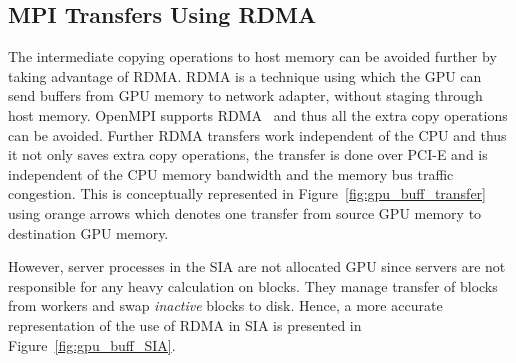 \subsection{MPI Transfers Using RDMA}
The intermediate copying operations to host memory can be avoided further by
taking advantage of RDMA. RDMA is a technique using
which the GPU can send buffers from GPU memory to network adapter, without staging
through host memory. OpenMPI supports RDMA~\cite{openmpi-cudaaware} and thus all
the extra copy operations can be avoided.
Further RDMA transfers work independent of the CPU and thus it not only saves
extra copy operations, the transfer is done over PCI-E and is independent
of the CPU memory bandwidth and the memory bus traffic congestion.
This is conceptually represented in Figure~\ref{fig:gpu_buff_transfer} using orange
arrows which denotes one transfer from source GPU memory to destination GPU memory.

However, server processes in the SIA are not allocated GPU since servers are not responsible
for any heavy calculation on blocks. They manage transfer of blocks from workers and
swap \textit{inactive} blocks to disk. Hence, a more accurate representation of
the use of RDMA in SIA is presented in Figure~\ref{fig:gpu_buff_SIA}.

